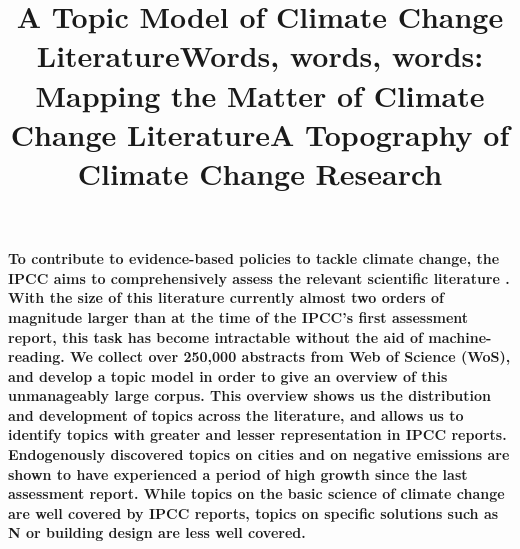 \documentclass{article}
\title{A Topic Model of Climate Change Literature}
\title{Words, words, words: Mapping the Matter of Climate Change Literature}
\title{A Topography of Climate Change Research}
\begin{document}
\maketitle

\linenumbers

\textbf{
To contribute to evidence-based policies to tackle climate change, the IPCC aims to comprehensively assess the relevant scientific literature \citep{IPCC2013}. With the size of this literature currently almost two orders of magnitude larger than at the time of the IPCC's first assessment report, this task has become intractable without the aid of machine-reading. We collect over 250,000 abstracts from Web of Science (WoS), and develop a topic model in order to give an overview of this unmanageably large corpus. This overview shows us the distribution and development of topics across the literature, and allows us to identify topics with greater and lesser representation in IPCC reports. Endogenously discovered topics on cities and on negative emissions are shown to have experienced a period of high growth since the last assessment report. While topics on the basic science of climate change are well covered by IPCC reports, topics on specific solutions such as N or building design are less well covered. %
}
\end{document}
